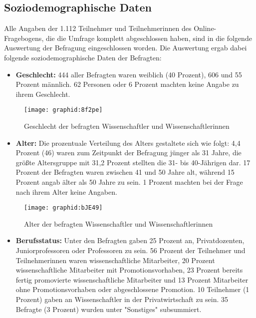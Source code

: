 \subsection{Soziodemographische Daten}

Alle Angaben der 1.112 Teilnehmer und Teilnehmerinnen des Online-Fragebogens, die die Umfrage komplett abgeschlossen haben, sind in die folgende Auswertung der Befragung eingeschlossen worden. Die Auswertung ergab dabei folgende soziodemographische Daten der Befragten:

\begin{itemize}
\item \textbf{Geschlecht:} 444 aller Befragten waren weiblich (40 Prozent), 606 und 55 Prozent männlich. 62 Personen oder 6 Prozent machten keine Angabe zu ihrem Geschlecht.
\end{itemize}

\begin{figure}[h!]
\texttt{[image: graphid:8f2pe]}
\caption{Geschlecht der befragten Wissenschaftler und Wissenschaftlerinnen}
\end{figure}

\begin{itemize}
\item \textbf{Alter:} Die prozentuale Verteilung des Alters gestaltete sich wie folgt: 4,4 Prozent (46) waren zum Zeitpunkt der Befragung jünger als 31 Jahre, die größte Altersgruppe mit 31,2 Prozent stellten die 31- bis 40-Jährigen dar. 17 Prozent der Befragten waren zwischen 41 und 50 Jahre alt, während 15 Prozent angab älter als 50 Jahre zu sein. 1 Prozent machten bei der Frage nach ihrem Alter keine Angaben.
\end{itemize}

\begin{figure}[h!]
\texttt{[image: graphid:bJE49]}
\caption{Alter der befragten Wissenschaftler und Wissenschaftlerinnen}
\end{figure}

\begin{itemize}
\item \textbf{Berufsstatus:} Unter den Befragten gaben 25 Prozent an, Privatdozenten, Juniorprofessoren oder Professoren zu sein. 56 Prozent der Teilnehmer und Teilnehmerinnen waren wissenschaftliche Mitarbeiter, 20 Prozent wissenschaftliche Mitarbeiter mit Promotionsvorhaben, 23 Prozent bereits fertig promovierte wissenschaftliche Mitarbeiter und 13 Prozent Mitarbeiter ohne Promotionsvorhaben oder abgeschlossene Promotion. 10 Teilnehmer (1 Prozent) gaben an Wissenschaftler in der Privatwirtschaft zu sein. 35 Befragte (3 Prozent) wurden unter "Sonstiges" subsummiert.
\end{itemize}


